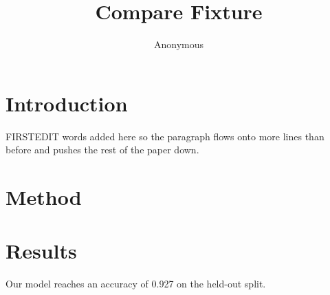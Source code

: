 \documentclass[twocolumn]{article}
\begin{document}
\title{Compare Fixture}\author{Anonymous}\maketitle
\section{Introduction}
\lipsum[1]

\lipsum[2] FIRSTEDIT words added here so the paragraph flows onto more lines than before and pushes the rest of the paper down.
\section{Method}
\lipsum[3-8]
\section{Results}
\lipsum[9-14]

Our model reaches an accuracy of 0.927 on the held-out split.

\lipsum[15-18]
\end{document}
